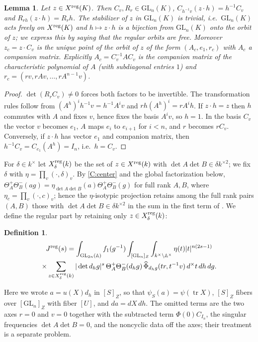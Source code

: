 \documentclass[11pt,oneside,notitlepage]{book}
\numberwithin{equation}{section}
\theoremstyle{plain}
\newtheorem{lemma}[theorem]{Lemma}
\theoremstyle{definition}
\newtheorem{definition}[theorem]{Definition}
\newcommand{\A}{\mathbb{A}}
\newcommand{\GL}{\mathrm{GL}}
\newcommand{\tr}{\operatorname{tr}}
\newcommand{\hil}[2]{(#1,#2)}
\begin{document}
	\begin{lemma}\label{lem:free}
		Let $z\in X^{\rm reg}(K)$. Then $C_v,R_r\in\GL_n(K)$, $C_{h^{-1}v}(z\cdot h)=h^{-1}C_v$ and $R_{rh}(z\cdot h)=R_rh$. The stabilizer of $z$ in $\GL_n(K)$ is trivial, i.e.\ $\GL_n(K)$ acts freely on $X^{\rm reg}(K)$ and $h\mapsto z\cdot h$ is a bijection from $\GL_n(K)$ onto the orbit of $z$; we express this by saying that the regular orbits are \emph{free}. Moreover $z_c=z\cdot C_v$ is the unique point of the orbit of $z$ of the form $(A_c,e_1,r_c)$ with $A_c$ a companion matrix. Explicitly $A_c=C_v^{-1}AC_v$ is the companion matrix of the characteristic polynomial of $A$ (with subdiagonal entries $1$) and $r_c=(rv,rAv,\dots,rA^{n-1}v)$.
	\end{lemma}
	\begin{proof}
		$\det(R_rC_v)\ne0$ forces both factors to be invertible. The transformation rules follow from $(A^h)^ih^{-1}v=h^{-1}A^iv$ and $rh(A^h)^i=rA^ih$. If $z\cdot h=z$ then $h$ commutes with $A$ and fixes $v$, hence fixes the basis $A^iv$, so $h=1$. In the basis $C_v$ the vector $v$ becomes $e_1$, $A$ maps $e_i$ to $e_{i+1}$ for $i<n$, and $r$ becomes $rC_v$. Conversely, if $z\cdot h$ has vector $e_1$ and companion matrix, then $h^{-1}C_v=C_{e_1}(A^h)=I_n$, i.e.\ $h=C_v$.
	\end{proof}
	

	
	For $\delta\in k^\times$ let $X^{\rm reg}_\delta(k)$ be the set of $z\in X^{\rm reg}(k)$ with $\det A\det B\in\delta k^{\times2}$; we fix $\delta$ with $\eta=\prod_v\hil{\cdot}{\delta}_v$.
	 By \ref{C:center} and the global factorization below, $\Theta^+_A\Theta^-_B(ag)=\eta_{\det A\det B}(a)\Theta^+_A\Theta^-_B(g)$ for full rank $A,B$, where $\eta_c=\prod_v\hil\cdot c_v$; hence the $\eta$-isotypic projection retains among the full rank pairs $(A,B)$ those with $\det A\det B\in\delta k^{\times2}$ in the sum in the first term of  . We define the regular part by retaining only $z\in X^{\rm reg}_\delta(k)$:
	 \begin{definition}
	\begin{multline}\label{eq:Jreg}
		J^{\rm reg}(s)=\int_{\GL_{2n}(\A)}f_1(g^{-1})\int_{[\GL_n]_Z}\int_{k^\times\backslash\A^\times}\eta(t)|t|^{n(2s-1)}\\
		\times\sum_{z\in X^{\rm reg}_\delta(k)}|\det d_hg|^s\,\Theta^+_A\Theta^-_B(d_hg)\,\widehat\Phi_{d_hg}(tr,t^{-1}v)\,d^\times t\,dh\,dg .
	\end{multline}
		 \end{definition}
	Here we wrote $a=u(X)d_h$ in $[S]_Z$, so that $\psi_S(a)=\psi(\tr X)$, $[S]_Z$ fibers over $[\GL_n]_Z$ with fiber $[U]$, and $da=dX\,dh$. The omitted terms are the two axes $r=0$ and $v=0$ together with the subtracted term $\Phi(0)C_{I_n}$, the singular frequencies $\det A\det B=0$, and the noncyclic data off the axes; their treatment is a separate problem.%
	
\end{document}
